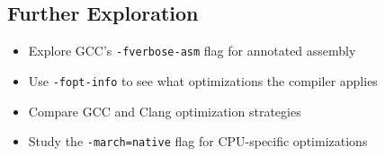 \subsection{Further Exploration}
\begin{itemize}
\item Explore GCC's \texttt{-fverbose-asm} flag for annotated assembly
\item Use \texttt{-fopt-info} to see what optimizations the compiler applies
\item Compare GCC and Clang optimization strategies
\item Study the \texttt{-march=native} flag for CPU-specific optimizations
\end{itemize}
